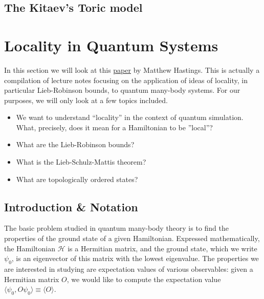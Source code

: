 \documentclass{book}
\theoremstyle{definition}
\newcommand{\had}{\mathcal{H}}
\begin{document}
\subsection{The Kitaev's Toric model}











\newpage




\section{Locality in Quantum Systems}

In this section we will look at this \href{https://arxiv.org/pdf/1008.5137.pdf}{\underline{paper}} by Matthew Hastings. This is actually a compilation of lecture notes focusing on the application of ideas of locality, in particular Lieb-Robinson bounds, to quantum many-body systems. For our purposes, we will only look at a few topics included. 
\begin{itemize}
	\item We want to understand ``locality'' in the context of quantum simulation. What, precisely, does it mean for a Hamiltonian to be ''local''? 
	
	\item What are the Lieb-Robinson bounds? 
	
	\item What is the Lieb-Schulz-Mattis theorem?
	
	\item What are topologically ordered states? 
\end{itemize}





\subsection{Introduction \& Notation}

The basic problem studied in quantum many-body theory is to find the properties of the ground state of a given
Hamiltonian. Expressed mathematically, the Hamiltonian $\had$ is a Hermitian matrix, and the ground state, which we write $\psi_0$, is an eigenvector of this matrix with the lowest eigenvalue.  The properties we are interested in studying
are expectation values of various observables: given a Hermitian matrix $O$, we would like to compute the expectation value $\langle \psi_0 , O \psi_0\rangle \equiv \langle O \rangle$. \\
\end{document}
